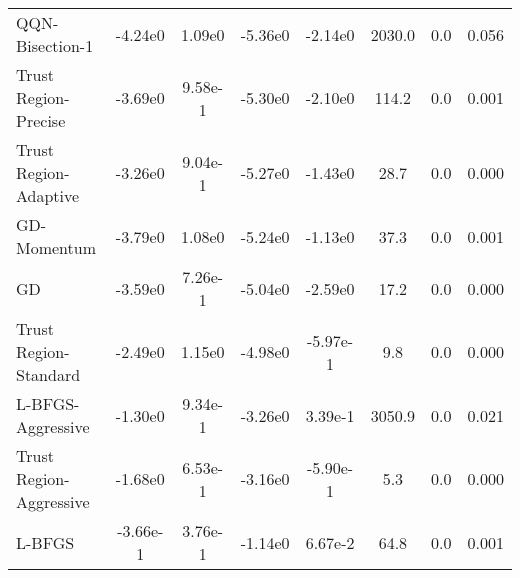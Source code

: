 \documentclass{article}
\begin{document}
\begin{table}[htbp]
{\begin{tabular}{p{2.5cm}*{7}{c}}
QQN-Bisection-1 & -4.24e0 & 1.09e0 & -5.36e0 & -2.14e0 & 2030.0 & 0.0 & 0.056 \\
Trust Region-Precise & -3.69e0 & 9.58e-1 & -5.30e0 & -2.10e0 & 114.2 & 0.0 & 0.001 \\
Trust Region-Adaptive & -3.26e0 & 9.04e-1 & -5.27e0 & -1.43e0 & 28.7 & 0.0 & 0.000 \\
GD-Momentum & -3.79e0 & 1.08e0 & -5.24e0 & -1.13e0 & 37.3 & 0.0 & 0.001 \\
GD & -3.59e0 & 7.26e-1 & -5.04e0 & -2.59e0 & 17.2 & 0.0 & 0.000 \\
Trust Region-Standard & -2.49e0 & 1.15e0 & -4.98e0 & -5.97e-1 & 9.8 & 0.0 & 0.000 \\
L-BFGS-Aggressive & -1.30e0 & 9.34e-1 & -3.26e0 & 3.39e-1 & 3050.9 & 0.0 & 0.021 \\
Trust Region-Aggressive & -1.68e0 & 6.53e-1 & -3.16e0 & -5.90e-1 & 5.3 & 0.0 & 0.000 \\
L-BFGS & -3.66e-1 & 3.76e-1 & -1.14e0 & 6.67e-2 & 64.8 & 0.0 & 0.001 \\
\bottomrule
\end{tabular}
}
\end{table}
\end{document}
